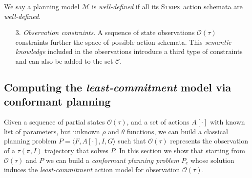 \documentclass{article}
\newcommand{\tup}[1]{{\langle #1 \rangle}}
\newcommand{\strips}{\textsc{Strips}}
\begin{document}
We say a planning model $\mathcal{M}$ is {\em well-defined} if all its \strips\ action schemata are {\em well-defined}.

\begin{enumerate}
\item[3.] {\em Observation constraints}. A sequence of state observations $\mathcal{O}(\tau)$ constraints further the space of possible action schemata. This \emph{semantic knowledge} included in the observations introduce a third type of constraints and can also be added to the set $\mathcal{C}$.
\end{enumerate}


\subsection{Computing the {\em least-commitment} model via conformant planning}
Given a sequence of partial states $\mathcal{O}(\tau)$, and a set of actions $A[\cdot]$ with known list of parameters, but unknown $\rho$ and $\theta$ functions, we can build a classical planning problem $P=\tup{F,A[\cdot],I,G}$ such that $\mathcal{O}(\tau)$ represents the observation of a $\tau(\pi,I)$ trajectory that solves $P$. In this section we show that starting from $\mathcal{O}(\tau)$ and $P$ we can build a {\em conformant planning problem} $P_c$ whose solution induces the {\em least-commitment} action model for observation $\mathcal{O}(\tau)$.
\end{document}
